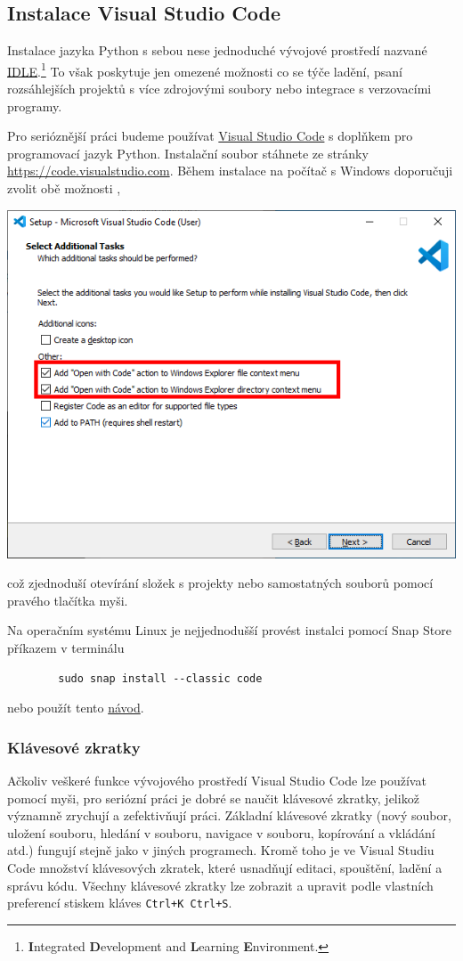 \documentclass[a4paper,11pt,twoside]{article}
\def\code#1{\textnormal{\texttt{#1}}}
\def\abbreviation#1{\textnormal{\textsc{#1}}}
\theoremstyle{red}
\theoremstyle{green}
\begin{document}
\subsection{Instalace Visual Studio Code}
    Instalace jazyka Python s sebou nese jednoduché vývojové prostředí nazvané \abbreviation{\href{https://docs.python.org/3/library/idle.html}{IDLE}}.\footnote{
        {\bf I}ntegrated {\bf D}evelopment and {\bf L}earning {\bf E}nvironment.
    }
    To však poskytuje jen omezené možnosti co se týče ladění, psaní rozsáhlejších projektů s více zdrojovými soubory nebo integrace s verzovacími programy.

    Pro serióznější práci budeme používat \href{https://code.visualstudio.com}{Visual Studio Code} s doplňkem pro programovací jazyk Python.
    Instalační soubor stáhnete ze stránky \url{https://code.visualstudio.com}.
    Během instalace na počítač s Windows doporučuji zvolit obě možnosti ,
    \begin{center}\includegraphics[width=0.5\linewidth]{VSCodeInstall.png}\end{center}
    což zjednoduší otevírání složek s projekty nebo samostatných souborů pomocí pravého tlačítka myši.

    Na operačním systému Linux je nejjednodušší provést instalci pomocí Snap Store příkazem v terminálu
    \begin{lstlisting}
        sudo snap install --classic code\end{lstlisting}
    nebo použít tento \href{https://code.visualstudio.com/docs/setup/linux}{návod}.
    
    \subsubsection{Klávesové zkratky}
    Ačkoliv veškeré funkce vývojového prostředí Visual Studio Code lze používat pomocí myši, pro seriózní práci je dobré se naučit klávesové zkratky, jelikož významně zrychují a zefektivňují práci.
    Základní klávesové zkratky (nový soubor, uložení souboru, hledání v souboru, navigace v souboru, kopírování a vkládání atd.) fungují stejně jako v jiných programech.
    Kromě toho je ve Visual Studiu Code množství klávesových zkratek, které usnadňují editaci, spouštění, ladění a správu kódu.
    Všechny klávesové zkratky lze zobrazit a upravit podle vlastních preferencí stiskem kláves \code{Ctrl+K Ctrl+S}.
\end{document}
